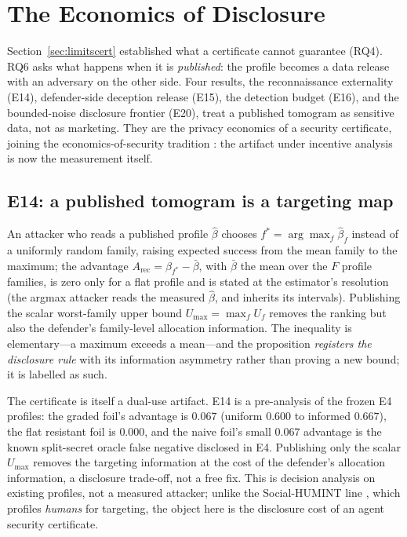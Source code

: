 \section{The Economics of Disclosure}\label{sec:disclosure}

Section~\ref{sec:limitscert} established what a certificate cannot
guarantee (RQ4). RQ6 asks what happens when it is \emph{published}: the
profile becomes a data release with an adversary on the other side.
Four results, the reconnaissance externality (E14), defender-side
deception release (E15), the detection budget (E16), and the bounded-noise
disclosure frontier (E20), treat a published tomogram as sensitive data,
not as marketing. They are the privacy economics of a security certificate,
joining the economics-of-security tradition \cite{anderson2006}: the
artifact under incentive analysis is now the measurement itself.

\subsection{E14: a published tomogram is a targeting map}\label{sec:recon}

\begin{proposition}\label{prop:recon}
An attacker who reads a published profile $\hat\beta$ chooses
$f^*=\arg\max_f\hat\beta_f$ instead of a uniformly random family, raising
expected success from the mean family to the maximum; the advantage
$A_{\mathrm{rec}}=\beta_{f^*}-\bar\beta$, with $\bar\beta$ the mean over
the $F$ profile families, is zero only for a flat profile and is stated at
the estimator's resolution (the argmax attacker reads the measured
$\hat\beta$, and inherits its intervals). Publishing the scalar worst-family upper bound
$U_{\max}=\max_f U_f$ removes the ranking but also the defender's family-level
allocation information. The inequality is elementary---a maximum exceeds
a mean---and the proposition \emph{registers the disclosure rule} with
its information asymmetry rather than proving a new bound; it is labelled
as such.
\end{proposition}

The certificate is itself a dual-use artifact. E14 is a pre-analysis of the
frozen E4 profiles: the graded foil's advantage is $0.067$ (uniform $0.600$
to informed $0.667$), the flat resistant foil is $0.000$, and the naive
foil's small $0.067$ advantage is the known split-secret oracle false
negative disclosed in E4. Publishing only the scalar $U_{\max}$ removes the
targeting information at the cost of the defender's allocation
information, a disclosure trade-off, not a free fix. This is decision
analysis on existing profiles, not a measured attacker; unlike the
Social-HUMINT line \cite{socialhumint2026}, which profiles \emph{humans} for
targeting, the object here is the disclosure cost of an agent security
certificate.


